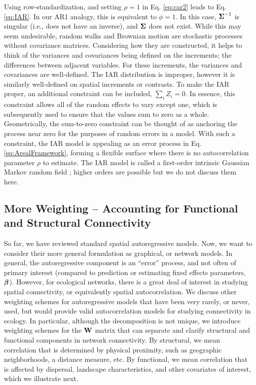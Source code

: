 \documentclass[11pt, titlepage]{article}\usepackage[]{graphicx}\usepackage[]{color}
\begin{document}
\begin{spacing}{1.9}
\begin{flushleft}
Using row-standardization, and setting $\rho = 1$ in Eq. \ref{eq:car2} leads to Eq. \ref{eq:IAR}.  In our AR1 analogy, this is equivalent to $\phi = 1$.  In this case, $\mbox{\boldmath $\Sigma$}^{-1}$ is singular (i.e., does not have an inverse), and $\mbox{\boldmath $\Sigma$}$ does not exist. While this may seem undesirable, random walks and Brownian motion are stochastic processes without covariance matrices.  Considering how they are constructed, it helps to think of the variances and covariances being defined on the increments; the differences between adjacent variables.  For these increments, the variances and covariances are well-defined. The IAR distribution is improper, however it is similarly well-defined on spatial increments or contrasts. To make the IAR proper, an additional constraint can be included, $\sum_i Z_i=0$. In essence, this constraint allows all of the random effects to vary except one, which is subsequently used to ensure that the values sum to zero as a whole. Geometrically, the sum-to-zero constraint can be thought of as anchoring the process near zero for the purposes of random errors in a model. With such a constraint, the IAR model is appealing as an error process in Eq. \ref{eq:ArealFramework}, forming a flexible surface where there is no autocorrelation parameter $\rho$ to estimate.  The IAR model is called a first-order intrinsic Gaussian Markov random field \cite[][p. 93]{Rue:Held:Gaus:2005}; higher orders are possible but we do not discuss them here. 


\subsection*{More Weighting -- Accounting for Functional and Structural Connectivity}

So far, we have reviewed standard spatial autoregressive models. Now, we want to consider their more general formulation as graphical, or network models. In general, the autoregressive component is an ``error'' process, and not often of primary interest (compared to prediction or estimating fixed effects parameters, $\mbox{\boldmath $\beta$}$).  However, for ecological networks, there is a great deal of interest in studying spatial connectivity, or equivalently spatial autocorrelation. We discuss other weighting schemes for autoregressive models that have been very rarely, or never, used, but would provide valid autocorrelation models for studying connectivity in ecology.  In particular, although the decomposition is not unique, we introduce weighting schemes for the $\mathbf{W}$ matrix that can separate and clarify structural and functional components in network connectivity.  By structural, we mean correlation that is determined by physical proximity, such as geographic neighborhoods, a distance measure, etc.  By functional, we mean correlation that is affected by dispersal, landscape characteristics, and other covariates of interest, which we illustrate next.


\end{flushleft}
\end{spacing}
\end{document}
